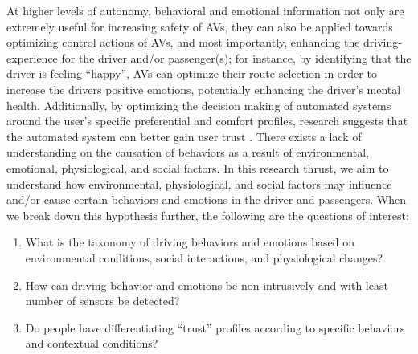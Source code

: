 At higher levels of autonomy, behavioral and emotional information not only are extremely useful for increasing safety of AVs, they can also be applied towards optimizing control actions of AVs, and most importantly, enhancing the  driving-experience for the driver and/or passenger(s); for instance, by identifying that the driver is feeling ``happy'', AVs can optimize their route selection in order to increase the drivers positive emotions, potentially enhancing the driver's mental health. 
Additionally, by optimizing the decision making of automated systems around the user's specific preferential and comfort profiles, research suggests that the automated system can better gain user trust \cite{mouloua2018automation, noah2017first}. 
There exists a lack of understanding on the causation of behaviors as a result of environmental, emotional, physiological, and social factors. %
In this research thrust, we aim to understand how environmental, physiological, and social factors may influence and/or cause certain behaviors and emotions in the driver and passengers. 
When we break down this hypothesis further, the following are the questions of interest:
\begin{enumerate}[itemsep=0pt,parsep=0pt,topsep=4pt,leftmargin=0.4in]
    \item What is the taxonomy of driving behaviors and emotions based on environmental conditions, social interactions, and physiological changes?
    \item How can driving behavior and emotions be non-intrusively and with least number of sensors be detected?
    \item Do people have differentiating “trust” profiles according to specific behaviors and contextual conditions?  
\end{enumerate}

